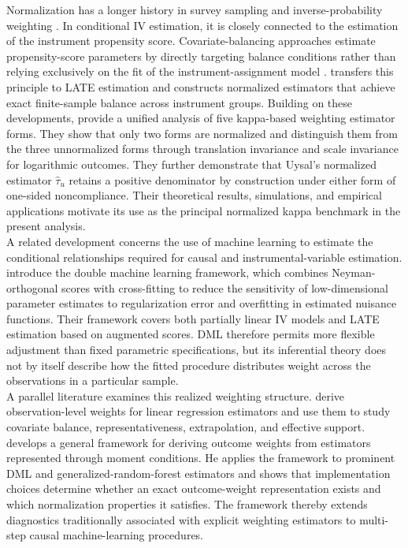 \documentclass[12pt, a4paper, oneside]{article}
\theoremstyle{plain}
\theoremstyle{definition}
\begin{document}
Normalization has a longer history in survey sampling and inverse-probability weighting \citep{hajek1971comment,busso2014finite}. In conditional IV estimation, it is closely connected to the estimation of the instrument propensity score. Covariate-balancing approaches estimate propensity-score parameters by directly targeting balance conditions rather than relying exclusively on the fit of the instrument-assignment model \citep{imai2014covariate}. \citet{heiler2022efficient} transfers this principle to LATE estimation and constructs normalized estimators that achieve exact finite-sample balance across instrument groups. Building on these developments, \citet{sloczynski2025abadie} provide a unified analysis of five kappa-based weighting estimator forms. They show that only two forms are normalized and distinguish them from the three unnormalized forms through translation invariance and scale invariance for logarithmic outcomes. They further demonstrate that Uysal's normalized estimator $\widehat\tau_u$ retains a positive denominator by construction under either form of one-sided noncompliance. Their theoretical results, simulations, and empirical applications motivate its use as the principal normalized kappa benchmark in the present analysis.\\
A related development concerns the use of machine learning to estimate the conditional relationships required for causal and instrumental-variable estimation. \citet{chernozhukov2018double} introduce the double machine learning framework, which combines Neyman-orthogonal scores with cross-fitting to reduce the sensitivity of low-dimensional parameter estimates to regularization error and overfitting in estimated nuisance functions. Their framework covers both partially linear IV models and LATE estimation based on augmented scores. DML therefore permits more flexible adjustment than fixed parametric specifications, but its inferential theory does not by itself describe how the fitted procedure distributes weight across the observations in a particular sample.\\
A parallel literature examines this realized weighting structure. \citet{chattopadhyay2023implied} derive observation-level weights for linear regression estimators and use them to study covariate balance, representativeness, extrapolation, and effective support. \citet{knaus2024treatment} develops a general framework for deriving outcome weights from estimators represented through moment conditions. He applies the framework to prominent DML and generalized-random-forest estimators and shows that implementation choices determine whether an exact outcome-weight representation exists and which normalization properties it satisfies. The framework thereby extends diagnostics traditionally associated with explicit weighting estimators to multi-step causal machine-learning procedures.\\
\end{document}
